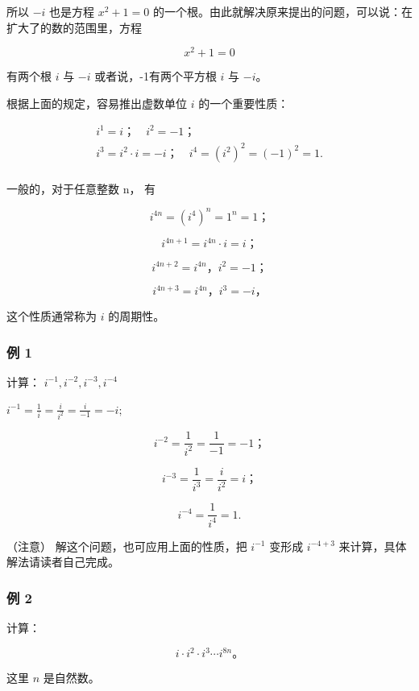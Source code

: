 所以 \(-i\) 也是方程 \(x^{2} + 1 = 0\)
的一个根。由此就解决原来提出的问题，可以说：在扩大了的数的范围里，方程

\[
x ^ {2} + 1 = 0
\]

有两个根 \(i\) 与 \(-i\) 或者说，-1有两个平方根 \(i\) 与 \(-i\)。

根据上面的规定，容易推出虚数单位 \(i\) 的一个重要性质：

\[
\begin{array}{l} i ^ {1} = i\text{；} \quad i ^ {2} = - 1\text{；} \\ i ^ {3} = i ^ {2} \cdot i = - i\text{；} \quad i ^ {4} = (i ^ {2}) ^ {2} = (- 1) ^ {2} = 1. \\ \end{array}
\]

一般的，对于任意整数 n， 有

\[
i ^ {4 n} = (i ^ {4}) ^ {n} = 1 ^ {n} = 1\text{；}
\]

\[
i ^ {4 n + 1} = i ^ {4 n} \cdot i = i\text{；}
\]

\[
i ^ {4 n + 2} = i ^ {4 n}\text{，} i ^ {2} = - 1\text{；}
\]

\[
i ^ {4 n + 3} = i ^ {4 n}\text{，} i ^ {3} = - i\text{，}
\]

这个性质通常称为 \(i\) 的周期性。

\subsubsection{例 1}

计算： \(i^{-1},i^{-2},i^{-3},i^{-4}\)

\(i^{-1} = \frac{1}{i} = \frac{i}{i^2} = \frac{i}{-1} = -i;\)

\[
i ^ {- 2} = \frac {1}{i ^ {2}} = \frac {1}{- 1} = - 1\text{；}
\]

\[
i ^ {- 3} = \frac {1}{i ^ {3}} = \frac {i}{i ^ {2}} = i\text{；}
\]

\[
i ^ {- 4} = \frac {1}{i ^ {4}} = 1.
\]

（注意） 解这个问题，也可应用上面的性质，把 \(i^{-1}\) 变形成
\(i^{-4 + 3}\) 来计算，具体解法请读者自己完成。

\subsubsection{例 2}

计算：

\[
i\cdot i^2\cdot i^3\cdots i^{8n}\text{。}
\]

这里 \(n\) 是自然数。

